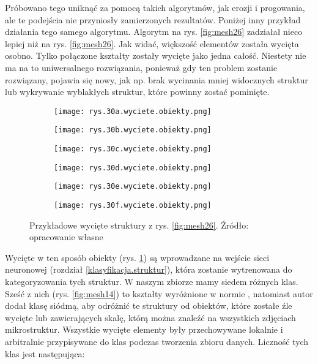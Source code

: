 Próbowano tego uniknąć za pomocą takich algorytmów, jak erozji i progowania, ale te podejścia nie przyniosły zamierzonych rezultatów. Poniżej inny przykład działania tego samego algorytmu.
Algorytm na rys. \ref{fig:mesh26} zadziałał nieco lepiej niż na rys. \ref{fig:mesh26}. Jak widać, większość elementów została wycięta osobno. Tylko połączone kształty zostały wycięte jako jedna całość. Niestety nie ma na to uniwersalnego rozwiązania, ponieważ gdy ten problem zostanie rozwiązany, pojawia się nowy, jak np. brak wycinania mniej widocznych struktur lub wykrywanie wyblakłych struktur, które powinny zostać pominięte.
\begin{figure}[h]
	\centering
	\begin{subfigure}{0.29\textwidth}
	    \centering
	    \texttt{[image: rys.30a.wyciete.obiekty.png]}
	\end{subfigure}
	\begin{subfigure}{0.29\textwidth}
	    \centering
	    \texttt{[image: rys.30b.wyciete.obiekty.png]}
	\end{subfigure}
	\begin{subfigure}{0.29\textwidth}
	    \centering
	    \texttt{[image: rys.30c.wyciete.obiekty.png]}
	\end{subfigure}
	\begin{subfigure}{0.29\textwidth}
	    \centering
	    \texttt{[image: rys.30d.wyciete.obiekty.png]}
	\end{subfigure}
	\begin{subfigure}{0.29\textwidth}
	    \centering
	    \texttt{[image: rys.30e.wyciete.obiekty.png]}
	\end{subfigure}
	\begin{subfigure}{0.29\textwidth}
	    \centering
	    \texttt{[image: rys.30f.wyciete.obiekty.png]}
	\end{subfigure}
	\caption{\label{fig:mesh28}Przykładowe wycięte struktury z rys. \ref{fig:mesh26}. Źródło: opracowanie własne}
\end{figure}
Wycięte w ten sposób obiekty (rys. \ref{fig:mesh28}) są wprowadzane na wejście sieci neuronowej (rozdział \ref{klasyfikacja.struktur}), która zostanie wytrenowana do kategoryzowania tych struktur. W naszym zbiorze mamy siedem różnych klas. Sześć z nich (rys. \ref{fig:mesh14}) to kształty wyróżnione w normie \cite{norma}, natomiast autor dodał klasę siódmą, aby odróżnić te struktury od obiektów, które zostałe źle wycięte lub zawierających skalę, którą można znaleźć na wszystkich zdjęciach mikrostruktur. Wszystkie wycięte elementy były przechowywane lokalnie i arbitralnie przypisywane do klas podczas tworzenia zbioru danych. Liczność tych klas jest następująca:
